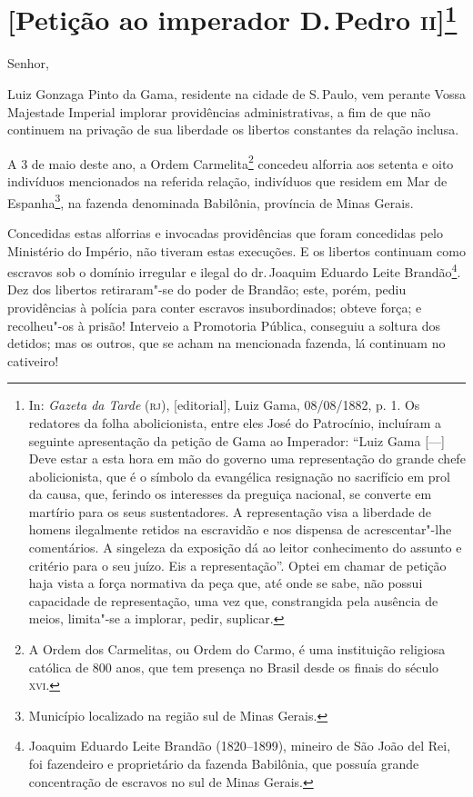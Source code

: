 \chapter{{[}Petição ao imperador D.\,Pedro \textsc{ii}{]}\footnote[*]{In:
  \emph{Gazeta da Tarde} (\textsc{rj}), {[}editorial{]}, Luiz Gama, 08/08/1882,
  p. 1. Os redatores da folha abolicionista, entre eles José do
  Patrocínio, incluíram a seguinte apresentação da petição de Gama ao
  Imperador: ``Luiz Gama {[}---{]} Deve estar a esta hora em mão do
  governo uma representação do grande chefe abolicionista, que é o
  símbolo da evangélica resignação no sacrifício em prol da causa, que,
  ferindo os interesses da preguiça nacional, se converte em martírio
  para os seus sustentadores.
  A representação visa a liberdade de homens ilegalmente retidos na
  escravidão e nos dispensa de acrescentar"-lhe comentários.
  A singeleza da exposição dá ao leitor conhecimento do assunto e
  critério para o seu juízo.
  Eis a representação''. Optei em chamar de petição haja vista a força
  normativa da peça que, até onde se sabe, não possui capacidade de
  representação, uma vez que, constrangida pela ausência de meios,
  limita"-se a implorar, pedir, suplicar.}}

Senhor,

Luiz Gonzaga Pinto da Gama, residente na cidade de S.\,Paulo, vem perante
Vossa Majestade Imperial implorar providências administrativas, a fim de
que não continuem na privação de sua liberdade os libertos constantes da
relação inclusa.

A 3 de maio deste ano, a Ordem Carmelita\footnote{A Ordem dos
  Carmelitas, ou Ordem do Carmo, é uma instituição religiosa católica de
  800 anos, que tem presença no Brasil desde os finais do século \textsc{xvi}.}
concedeu alforria aos setenta e oito indivíduos mencionados na referida
relação, indivíduos que residem em Mar de Espanha\footnote{Município
  localizado na região sul de Minas Gerais.}, na fazenda denominada
Babilônia, província de Minas Gerais.

Concedidas estas alforrias e invocadas providências que foram concedidas
pelo Ministério do Império, não tiveram estas execuções. E os libertos
continuam como escravos sob o domínio irregular e ilegal do dr.\,Joaquim
Eduardo Leite Brandão\footnote{Joaquim Eduardo Leite Brandão
  (1820--1899), mineiro de São João del Rei, foi fazendeiro e
  proprietário da fazenda Babilônia, que possuía grande concentração de
  escravos no sul de Minas Gerais.}. Dez dos libertos retiraram"-se do
poder de Brandão; este, porém, pediu providências à polícia para conter
escravos insubordinados; obteve força; e recolheu"-os à prisão! Interveio
a Promotoria Pública, conseguiu a soltura dos detidos; mas os outros,
que se acham na mencionada fazenda, lá continuam no cativeiro!

